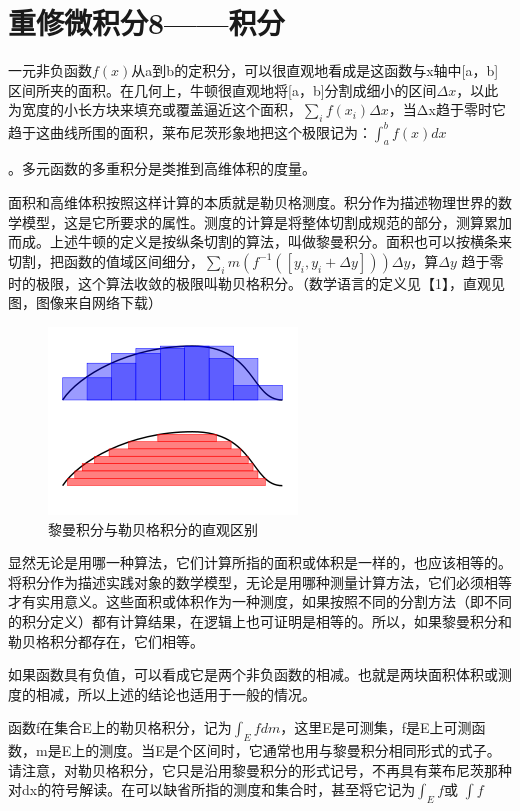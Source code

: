 \section{重修微积分8——积分}

一元非负函数$ f(x) $从a到b的定积分，可以很直观地看成是这函数与x轴中[a，b]区间所夹的面积。在几何上，牛顿很直观地将[a，b]分割成细小的区间$ \Delta x $，以此为宽度的小长方块来填充或覆盖逼近这个面积，$ \sum_{i}f(x_i)\Delta x $，当Δx趋于零时它趋于这曲线所围的面积，莱布尼茨形象地把这个极限记为：$ \int_{a}^{b} f(x)dx $

。多元函数的多重积分是类推到高维体积的度量。

面积和高维体积按照这样计算的本质就是勒贝格测度。积分作为描述物理世界的数学模型，这是它所要求的属性。测度的计算是将整体切割成规范的部分，测算累加而成。上述牛顿的定义是按纵条切割的算法，叫做黎曼积分。面积也可以按横条来切割，把函数的值域区间细分，$ \sum _i  m(f^{-1}([y_i, y_i+\Delta y])) \Delta y $，算$ \Delta y $ 趋于零时的极限，这个算法收敛的极限叫勒贝格积分。（数学语言的定义见【1】，直观见图，图像来自网络下载）
\begin{figure}[h]
	\centering
	\includegraphics[width=0.7\linewidth]{pic/130332sliyik6hvp1iki1d.png}
	\caption{黎曼积分与勒贝格积分的直观区别}
	\label{fig:130332sliyik6hvp1iki1d}
\end{figure}

显然无论是用哪一种算法，它们计算所指的面积或体积是一样的，也应该相等的。将积分作为描述实践对象的数学模型，无论是用哪种测量计算方法，它们必须相等才有实用意义。这些面积或体积作为一种测度，如果按照不同的分割方法（即不同的积分定义）都有计算结果，在逻辑上也可证明是相等的。所以，如果黎曼积分和勒贝格积分都存在，它们相等。

如果函数具有负值，可以看成它是两个非负函数的相减。也就是两块面积体积或测度的相减，所以上述的结论也适用于一般的情况。

函数f在集合E上的勒贝格积分，记为$ \int_E f d m $，这里E是可测集，f是E上可测函数，m是E上的测度。当E是个区间时，它通常也用与黎曼积分相同形式的式子。请注意，对勒贝格积分，它只是沿用黎曼积分的形式记号，不再具有莱布尼茨那种对dx的符号解读。在可以缺省所指的测度和集合时，甚至将它记为$ \int_E f $或 $ \int f  $

